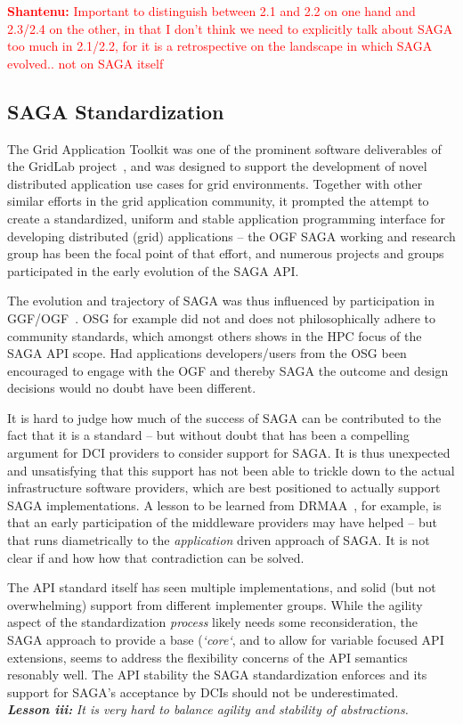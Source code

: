 \documentclass{article}
\newcommand{\I}[1]{\textit{#1}}
\newcommand{\B}[1]{\textbf{#1}}
\newcommand{\BI}[1]{\textbf{\textit{#1}}}
\newcommand{\jhanote}[1]{{\textcolor{red}{     \B{Shantenu:} #1 }}}
\newcommand{\jhanote}[1]{}
\begin{document}
  \jhanote{Important to distinguish between 2.1 and 2.2 on one hand and
  2.3/2.4 on the other, in that I don't think we need to explicitly talk
  about SAGA too much in 2.1/2.2, for it is a retrospective on the
  landscape in which SAGA evolved.. not on SAGA itself}


 \subsection{SAGA Standardization}

  The Grid Application Toolkit was one of the prominent software
  deliverables of the GridLab project~\cite{gridlab}, and was designed
  to support the development of novel distributed application use cases
  for grid environments.  Together with other similar efforts in the
  grid application community, it prompted the attempt to create
  a standardized, uniform and stable application programming interface
  for developing distributed (grid) applications -- the OGF SAGA working
  and research group has been the focal point of that effort, and
  numerous projects and groups participated in the early evolution of
  the SAGA API.  

  The evolution and trajectory of SAGA was thus influenced by
  participation in GGF/OGF~\cite{ogf_web}.  OSG for example did not and
  does not philosophically adhere to community standards, which amongst
  others shows in the HPC focus of the SAGA API scope. Had applications
  developers/users from the OSG been encouraged to engage with the OGF
  and thereby SAGA the outcome and design decisions would no doubt have
  been different.

  It is hard to judge how much of the success of SAGA can be contributed
  to the fact that it is a standard -- but without doubt that has been
  a compelling argument for DCI providers to consider support for SAGA.
  It is thus unexpected and unsatisfying that this support has not been
  able to trickle down to the actual infrastructure software providers,
  which are best positioned to actually support SAGA implementations.
  A lesson to be learned from DRMAA~\cite{drmaa}, for example, is that
  an early participation of the middleware providers may have helped --
  but that runs diametrically to the \I{application} driven approach of
  SAGA.  It is not clear if and how how that contradiction can be
  solved.

  The API standard itself has seen multiple implementations, and solid
  (but not overwhelming) support from different implementer groups.
  While the agility aspect of the standardization \I{process} likely
  needs some reconsideration, the SAGA approach to provide a base
  (\I{`core`}, and to allow for variable focused API extensions, seems
  to address the flexibility concerns of the API semantics resonably
  well.  The API stability the SAGA standardization enforces and its
  support for SAGA's acceptance by DCIs should not be underestimated.\\
  \BI{Lesson iii:} \I{It is very hard to balance agility and stability
  of abstractions.}
\end{document}
